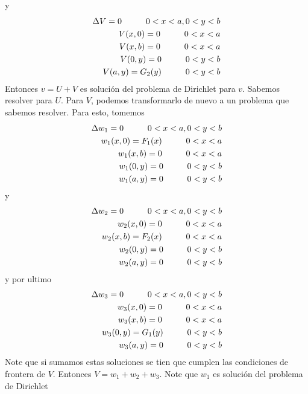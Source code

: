 \documentclass[11pt]{book}
\theoremstyle{plain}
\theoremstyle{definition}
\begin{document}
    y
    \begin{align*}
        \Delta V = 0 \hspace{10mm} 0<x<a, 0<y<b\\
        V(x,0) = 0 \hspace{10mm} 0<x<a\\
        V(x,b) = 0 \hspace{10mm} 0<x<a\\
        V(0,y) = 0 \hspace{10mm} 0<y<b\\
        V(a,y) = G_{2}(y) \hspace{10mm} 0<y<b
    \end{align*}
    Entonces $v = U + V$ es solución del problema de Dirichlet para $v$. Sabemos resolver para $U$. Para $V$, podemos transformarlo de nuevo a un problema que sabemos resolver. Para esto, tomemos
    \begin{align*}
        \Delta w_1 = 0 \hspace{10mm} 0<x<a, 0<y<b\\
        w_1(x,0) = F_{1}(x) \hspace{10mm} 0<x<a\\
        w_1(x,b) = 0 \hspace{10mm} 0<x<a\\
        w_1(0,y) = 0 \hspace{10mm} 0<y<b\\
        w_1(a,y) = 0 \hspace{10mm} 0<y<b
    \end{align*}
    y
    \begin{align*}
        \Delta w_2 = 0 \hspace{10mm} 0<x<a, 0<y<b\\
        w_2(x,0) = 0 \hspace{10mm} 0<x<a\\
        w_2(x,b) = F_{2}(x) \hspace{10mm} 0<x<a\\
        w_2(0,y) = 0 \hspace{10mm} 0<y<b\\
        w_2(a,y) = 0 \hspace{10mm} 0<y<b
    \end{align*}
    y por ultimo
    \begin{align*}
        \Delta w_3 = 0 \hspace{10mm} 0<x<a, 0<y<b\\
        w_3(x,0) = 0 \hspace{10mm} 0<x<a\\
        w_3(x,b) = 0 \hspace{10mm} 0<x<a\\
        w_3(0,y) = G_{1}(y) \hspace{10mm} 0<y<b\\
        w_3(a,y) = 0 \hspace{10mm} 0<y<b
    \end{align*}
    Note que si sumamos estas soluciones se tien que cumplen las condiciones de frontera de $V$. Entonces $V = w_1 + w_2 + w_3$. Note que $w_1$ es solución del problema de Dirichlet
\end{document}
